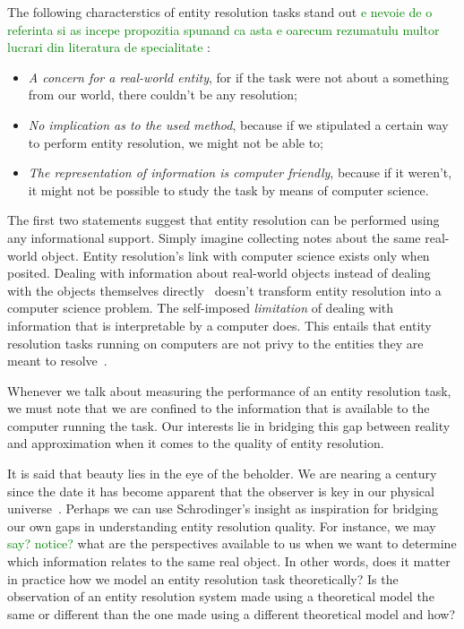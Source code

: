 \documentclass[journal]{IEEEtran}
\begin{document}
    The following characterstics of entity resolution tasks stand out
    \textcolor{green}{e nevoie de o referinta si as incepe propozitia spunand ca asta e oarecum rezumatulu multor lucrari din literatura de specialitate}
    :

    \begin{itemize}
        \item\textit{A concern for a real-world entity}, for if the task were
        not about a something from our world, there couldn't be any resolution;
        \item\textit{No implication as to the used method}, because if we
        stipulated a certain way to perform entity resolution, we might not be
        able to;
        \item\textit{The representation of information is computer friendly},
        because if it weren't, it might not be possible to study the task by
        means of computer science.
    \end{itemize}

    The first two statements suggest that entity resolution can be performed
    using any informational support.
    Simply imagine collecting notes about the same real-world object.
    Entity resolution's link with computer science exists only when posited.
    Dealing with information about real-world objects instead of dealing with
    the objects themselves directly~\cite{Tal11} doesn't transform entity
    resolution into a computer science problem.
    The self-imposed \textit{limitation} of dealing with information that is
    interpretable by a computer does.
    This entails that entity resolution tasks running on computers are not privy
    to the entities they are meant to resolve~\cite{Chen09}.

    Whenever we talk about measuring the performance of an entity resolution
    task, we must note that we are confined to the information that is available
    to the computer running the task.
    Our interests lie in bridging this gap between reality and approximation
    when it comes to the quality of entity resolution.

    It is said that beauty lies in the eye of the beholder.
    We are nearing a century since the date it has become apparent that the
    observer is key in our physical universe~\cite{schrodinger1926}.
    Perhaps we can use Schrodinger's insight as inspiration for bridging our own
    gaps in understanding entity resolution quality.
    For instance, we may 
    \textcolor{green}{say? notice?} 
    what are the perspectives available to us when we want
    to determine which information relates to the same real object.
    In other words, does it matter in practice how we model an entity resolution
    task theoretically?
    Is the observation of an entity resolution system made using a theoretical
    model the same or different than the one made using a different theoretical
    model and how?
\end{document}
